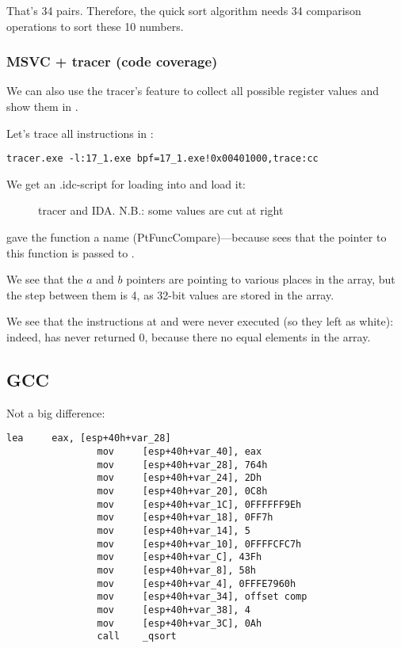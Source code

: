 That's 34 pairs.
Therefore, the quick sort algorithm needs 34 comparison operations to sort these 10 numbers.

\clearpage
\subsubsection{MSVC + tracer (code coverage)}

We can also use the tracer's feature to collect all possible register values and show them in \IDA.

Let's trace all instructions in \comp:

\begin{lstlisting}
tracer.exe -l:17_1.exe bpf=17_1.exe!0x00401000,trace:cc
\end{lstlisting}

We get an .idc-script for loading into \IDA and load it:

\begin{figure}[H]
\centering
{}
\caption{tracer and IDA. N.B.: 
some values are cut at right}
\label{fig:qsort_tracer_cc}
\end{figure}

\IDA gave the function a name (PtFuncCompare)---because \IDA sees that the pointer to this function is passed to \qsort.

We see that the $a$ and $b$ pointers are pointing to various places in the array, but the step between
them is 4, as 32-bit values are stored in the array.

We see that the instructions at  and  were never executed (so they left as white): 
indeed, \comp has never returned 0, because there no equal elements in the array.

\subsection{GCC}

Not a big difference:

\begin{lstlisting}[caption=GCC]
                lea     eax, [esp+40h+var_28]
                mov     [esp+40h+var_40], eax
                mov     [esp+40h+var_28], 764h
                mov     [esp+40h+var_24], 2Dh
                mov     [esp+40h+var_20], 0C8h
                mov     [esp+40h+var_1C], 0FFFFFF9Eh
                mov     [esp+40h+var_18], 0FF7h
                mov     [esp+40h+var_14], 5
                mov     [esp+40h+var_10], 0FFFFCFC7h
                mov     [esp+40h+var_C], 43Fh
                mov     [esp+40h+var_8], 58h
                mov     [esp+40h+var_4], 0FFFE7960h
                mov     [esp+40h+var_34], offset comp
                mov     [esp+40h+var_38], 4
                mov     [esp+40h+var_3C], 0Ah
                call    _qsort
\end{lstlisting}

